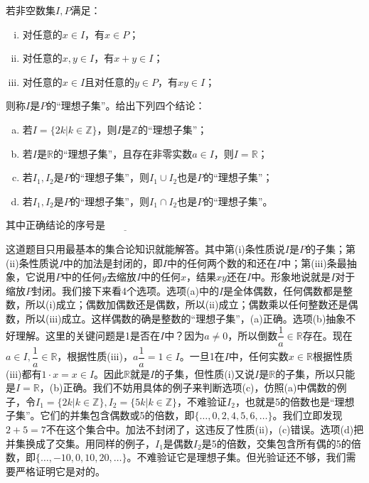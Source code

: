 \documentclass[b5paper]{ctexart}
\begin{document}
\begin{mdframed}
若非空数集$I, P$满足：

\begin{enumerate}[(i)]
\item 对任意的$x \in I$，有$x \in P$；
\item 对任意的$x, y \in I$，有$x + y \in I$；
\item 对任意的$x \in I$且对任意的$y \in P$，有$xy \in I$；
\end{enumerate}

则称$I$是$P$的“理想子集”。给出下列四个结论：

\begin{enumerate}[(a)]
\item 若$I = \{2k | k \in \mathbb{Z} \}$，则$I$是$\mathbb{Z}$的“理想子集”；
\item 若$I$是$\mathbb{R}$的“理想子集”，且存在非零实数$a \in I$，则$I = \mathbb{R}$；
\item 若$I_1, I_2$是$P$的“理想子集”，则$I_1 \cup I_2$也是$P$的“理想子集”；
\item 若$I_1, I_2$是$P$的“理想子集”，则$I_1 \cap I_2$也是$P$的“理想子集”。
\end{enumerate}

其中正确结论的序号是$\underline{\qquad \qquad}$

\end{mdframed}

这道题目只用最基本的集合论知识就能解答。其中第(i)条性质说$I$是$P$的子集；第(ii)条性质说$I$中的加法是封闭的，即$I$中的任何两个数的和还在$I$中；第(iii)条最抽象，它说用$P$中的任何$y$去缩放$I$中的任何$x$，结果$xy$还在$I$中。形象地说就是$I$对于缩放$P$封闭。我们接下来看4个选项。选项(a)中的$I$是全体偶数，任何偶数都是整数，所以(i)成立；偶数加偶数还是偶数，所以(ii)成立；偶数乘以任何整数还是偶数，所以(iii)成立。这样偶数的确是整数的“理想子集”，(a)正确。选项(b)抽象不好理解。这里的关键问题是1是否在$I$中？因为$a \ne 0$，所以倒数$\dfrac{1}{a} \in \mathbb{R}$存在。现在$a \in I, \dfrac{1}{a} \in \mathbb{R}$，根据性质(iii)，$a\dfrac{1}{a} = 1 \in I$。一旦1在$I$中，任何实数$x \in \mathbb{R}$根据性质(iii)都有$1 \cdot x = x \in I$。因此$\mathbb{R}$就是$I$的子集，但性质(i)又说$I$是$\mathbb{R}$的子集，所以只能是$I = \mathbb{R}$，(b)正确。我们不妨用具体的例子来判断选项(c)，仿照(a)中偶数的例子，令$I_1 = \{2k | k \in \mathbb{Z} \}, I_2 = \{5k | k \in \mathbb{Z} \}$，不难验证$I_2$，也就是5的倍数也是“理想子集”。它们的并集包含偶数或5的倍数，即$\{ \dotsc, 0, 2, 4, 5, 6, \dotsc\}$。我们立即发现$2 + 5 = 7$不在这个集合中。加法不封闭了，这违反了性质(ii)，(c)错误。选项(d)把并集换成了交集。用同样的例子，$I_1$是偶数$I_2$是5的倍数，交集包含所有偶的5的倍数，即$\{\dotsc, -10, 0, 10, 20, \dotsc\}$。不难验证它是理想子集。但光验证还不够，我们需要严格证明它是对的。
\end{document}
